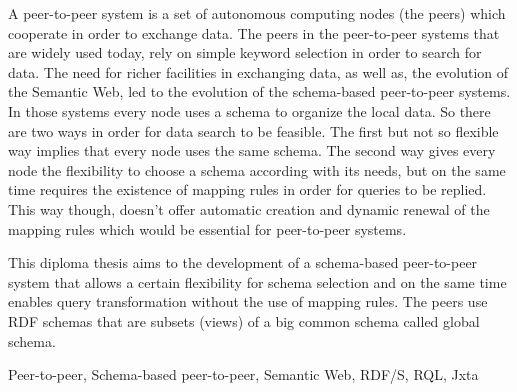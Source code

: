 \begin{abstracteng}
A peer-to-peer system is a set of autonomous computing nodes
(the peers) which cooperate in order to exchange data. The peers
in the peer-to-peer systems that are widely used today, rely on
simple keyword selection in order to search for data. The need for
richer facilities in exchanging data, as well as, the evolution of
the Semantic Web, led to the evolution of the schema-based
peer-to-peer systems. In those systems every node uses a schema to
organize the local data. So there are two ways in order for data
search to be feasible. The first but not so flexible way implies
that every node uses the same schema. The second way gives every
node the flexibility to choose a schema according with its needs,
but on the same time requires the existence of mapping rules in
order for queries to be replied. This way though, doesn't offer
automatic creation and dynamic renewal of the mapping rules which
would be essential for peer-to-peer systems.

This diploma thesis aims to the development of a schema-based
peer-to-peer system that allows a certain flexibility for schema
selection and on the same time enables query transformation
without the use of mapping rules. The peers use RDF schemas that
are subsets (views) of a big common schema called global schema.

   \begin{keywordseng}
    Peer-to-peer, Schema-based peer-to-peer, Semantic Web, RDF/S, RQL, Jxta
   \end{keywordseng}

\end{abstracteng}
